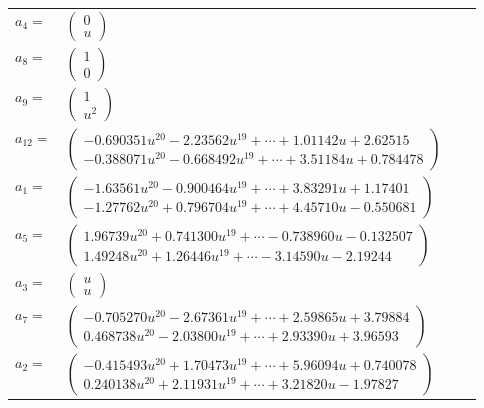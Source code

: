 \documentclass[1p]{elsarticle_modified}
\theoremstyle{definition}
\begin{document}
\begin{tabular}{m{7pt} m{180pt} m{7pt} m{180pt} }
\flushright $a_{4}=$&$\begin{pmatrix}0\\u\end{pmatrix}$ \\
\flushright $a_{8}=$&$\begin{pmatrix}1\\0\end{pmatrix}$ \\
\flushright $a_{9}=$&$\begin{pmatrix}1\\u^2\end{pmatrix}$ \\
\flushright $a_{12}=$&$\begin{pmatrix}-0.690351 u^{20}-2.23562 u^{19}+\cdots+1.01142 u+2.62515\\-0.388071 u^{20}-0.668492 u^{19}+\cdots+3.51184 u+0.784478\end{pmatrix}$ \\
\flushright $a_{1}=$&$\begin{pmatrix}-1.63561 u^{20}-0.900464 u^{19}+\cdots+3.83291 u+1.17401\\-1.27762 u^{20}+0.796704 u^{19}+\cdots+4.45710 u-0.550681\end{pmatrix}$ \\
\flushright $a_{5}=$&$\begin{pmatrix}1.96739 u^{20}+0.741300 u^{19}+\cdots-0.738960 u-0.132507\\1.49248 u^{20}+1.26446 u^{19}+\cdots-3.14590 u-2.19244\end{pmatrix}$ \\
\flushright $a_{3}=$&$\begin{pmatrix}u\\u\end{pmatrix}$ \\
\flushright $a_{7}=$&$\begin{pmatrix}-0.705270 u^{20}-2.67361 u^{19}+\cdots+2.59865 u+3.79884\\0.468738 u^{20}-2.03800 u^{19}+\cdots+2.93390 u+3.96593\end{pmatrix}$ \\
\flushright $a_{2}=$&$\begin{pmatrix}-0.415493 u^{20}+1.70473 u^{19}+\cdots+5.96094 u+0.740078\\0.240138 u^{20}+2.11931 u^{19}+\cdots+3.21820 u-1.97827\end{pmatrix}$ \\

\end{tabular}
\end{document}
